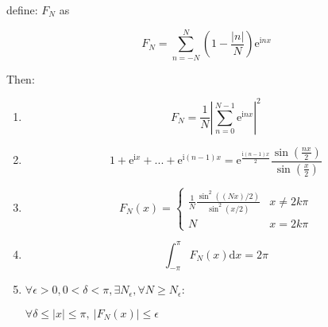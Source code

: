 \begin{thm}
    define: $F_N$ as

    \[
        F_N = \sum_{n=-N}^{N}\left(1 - \frac{|n|}{N}\right) \mathrm{e}^{\mathrm{i}nx}
    \]

    Then:

    \begin{enumerate}
        \item \[
            F_N = \frac{1}{N} \left| \sum_{n=0}^{N-1} \mathrm{e}^{ \mathrm{i} nx } \right|^2
        \]


        \item \[
        1 + \mathrm{e}^{\mathrm{i}x} + ... + \mathrm{e}^{\mathrm{i}(n-1)x} =  \mathrm{e}^{\frac{\mathrm{i}(n-1)x}{2}} \frac{\sin (\frac{nx}{2})}{\sin(\frac{x}{2})}
    \]

        \item \[
            F_N(x)= \begin{cases}
            \frac{1}{N} \frac{\sin^2 ((Nx)/2)}{\sin^2 (x/2)} & x \ne 2k \pi\\
            N & x = 2k \pi
            \end{cases}
        \]

        \item \[
            \int_{-\pi}^{\pi}F_N(x) \mathrm{d}x = 2\pi
        \]

        \item $\forall \epsilon > 0, 0 < \delta < \pi, \exists N_{\epsilon}, \forall N \ge N_{\epsilon}$:

        $\forall \delta \le |x| \le \pi,\: \left| F_N(x)\right| \le \epsilon$ 
    \end{enumerate}
\end{thm}


